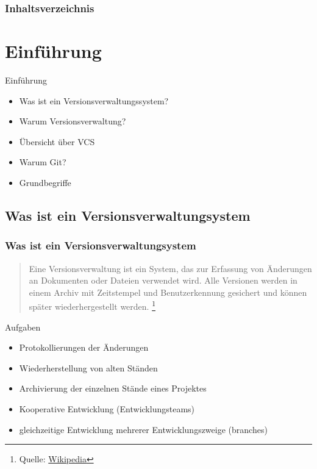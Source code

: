 \documentclass{beamer}
\begin{document}
\begin{frame}
\frametitle{Inhaltsverzeichnis}
\tableofcontents[hidesubsections]
\end{frame}

\section{Einführung} 
\begin{frame}[c]{}
\begin{center}
\begin{Huge}
Einführung
\end{Huge}
\vspace{1.5cm}
\begin{itemize}
\item Was ist ein Versionsverwaltungssystem? 
\item Warum Versionsverwaltung? 
\item Übersicht über VCS 
\item Warum Git?
\item Grundbegriffe
\end{itemize}
\end{center}
\end{frame}

\subsection{Was ist ein Versionsverwaltungsystem}

\begin{frame}\frametitle{Was ist ein Versionsverwaltungsystem} 
\begin{quote}
Eine Versionsverwaltung ist ein System, das zur Erfassung von Änderungen an Dokumenten oder Dateien verwendet wird. Alle Versionen werden in einem Archiv mit Zeitstempel und Benutzerkennung gesichert und können später wiederhergestellt werden.
\footnote{Quelle: \href{http://de.wikipedia.org/wiki/Versionsverwaltung}{Wikipedia}}
\end{quote} 

Aufgaben
\begin{itemize}
\item  Protokollierungen der Änderungen
\item  Wiederherstellung von alten Ständen 
\item  Archivierung der einzelnen Stände eines Projektes
\item  Kooperative Entwicklung (Entwicklungsteams)
\item  gleichzeitige Entwicklung mehrerer Entwicklungszweige (branches)
\end{itemize} 
\end{frame}
\end{document}
